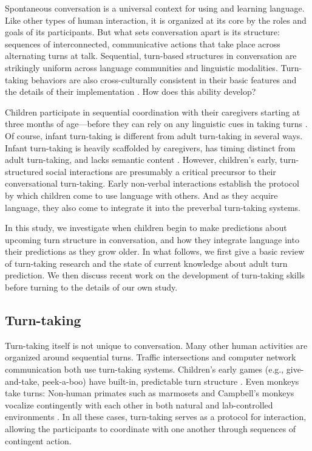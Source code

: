 \documentclass[authoryear, 12pt]{elsarticle}
\begin{document}
Spontaneous conversation is a universal context for using and learning language. Like other types of human interaction, it is organized at its core by the roles and goals of its participants. But what sets conversation apart is its structure: sequences of interconnected, communicative actions that take place across alternating turns at talk. Sequential, turn-based structures in conversation are strikingly uniform across language communities and linguistic modalities. Turn-taking behaviors are also cross-culturally consistent in their basic features and the details of their implementation \citep{stivers2009, dingemanse2013, de-vosInPrep}. How does this ability develop? 

Children participate in sequential coordination with their caregivers starting at three months of age---before they can rely on any linguistic cues in taking turns \citep{snow1977, jaffe2001, hilbrinkInPrep}. Of course, infant turn-taking is different from adult turn-taking in several ways. Infant turn-taking is heavily scaffolded by caregivers, has timing distinct from adult turn-taking, and lacks semantic content \citep{hilbrinkInPrep, jaffe2001, snow1977}. However, children's early, turn-structured social interactions are presumably a critical precursor to their conversational turn-taking. Early non-verbal interactions establish the protocol by which children come to use language with others. And as they acquire language, they also come to integrate it into the preverbal turn-taking systems.

In this study, we investigate when children begin to make predictions about upcoming turn structure in conversation, and how they integrate language into their predictions as they grow older. In what follows, we first give a basic review of turn-taking research and the state of current knowledge about adult turn prediction. We then discuss recent work on the development of turn-taking skills before turning to the details of our own study.

\subsection{Turn-taking}

Turn-taking itself is not unique to conversation. Many other human activities are organized around sequential turns. Traffic intersections and computer network communication both use turn-taking systems. Children's early games (e.g., give-and-take, peek-a-boo) have built-in, predictable turn structure \citep{ratner1978, ross1987}. Even monkeys take turns: Non-human primates such as marmosets and Campbell's monkeys vocalize contingently with each other in both natural and lab-controlled environments \citep{lemasson2011, takahashi2013}. In all these cases, turn-taking serves as a protocol for interaction, allowing the participants to coordinate with one another through sequences of contingent action. 
\end{document}
